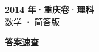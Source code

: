 \documentclass[zihao=-4, a4paper]{ctexart}
\begin{document}
\begin{center}
  {\Large\bfseries 2014 年·重庆卷·理科}\\[4pt]
  {\large 数学 · 简答版}
\end{center}
\medskip
{}

\clearpage
{}
\begin{center}{\Large\bfseries 答案速查}\end{center}
\medskip

\end{document}
